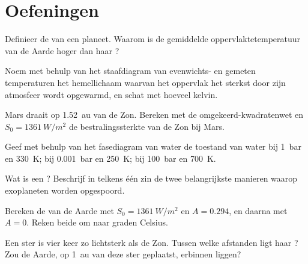 \section{Oefeningen}

\begin{exercise}[$\star$]\label{exo:g10:habitable-planet:1}
Definieer de  van een planeet. Waarom is de gemiddelde
oppervlaktetemperatuur van de Aarde hoger dan haar ?
\end{exercise}

\begin{exercise}[$\star$]\label{exo:g10:habitable-planet:2}
Noem met behulp van het staafdiagram van evenwichts- en gemeten temperaturen
het hemellichaam waarvan het oppervlak het sterkst door zijn atmosfeer wordt
opgewarmd, en schat met hoeveel kelvin.
\end{exercise}

\begin{exercise}[$\star$]\label{exo:g10:habitable-planet:3}
Mars draait op \qty{1.52}{au} van de Zon. Bereken met de omgekeerd-kwadratenwet
en $S_0 = \qty{1361}{W/m^2}$ de bestralingssterkte van de Zon bij Mars.
\end{exercise}

\begin{exercise}[$\star$]\label{exo:g10:habitable-planet:4}
Geef met behulp van het fasediagram van water de toestand van water bij
\qty{1}{bar} en \qty{330}{K}; bij \qty{0.001}{bar} en \qty{250}{K}; bij
\qty{100}{bar} en \qty{700}{K}.
\end{exercise}

\begin{exercise}[$\star$]\label{exo:g10:habitable-planet:5}
Wat is een ? Beschrijf in telkens één zin de twee belangrijkste
manieren waarop exoplaneten worden opgespoord.
\end{exercise}

\begin{exercise}[$\star\star$]\label{exo:g10:habitable-planet:6}
Bereken de  van de Aarde met $S_0 = \qty{1361}{W/m^2}$
en $A = 0.294$, en daarna met $A = 0$. Reken beide om naar graden Celsius.
\end{exercise}

\begin{exercise}[$\star\star$]\label{exo:g10:habitable-planet:7}
Een ster is vier keer zo lichtsterk als de Zon. Tussen welke afstanden ligt
haar ? Zou de Aarde, op \qty{1}{au} van deze ster geplaatst,
erbinnen liggen?
\end{exercise}

